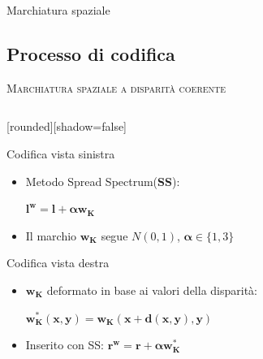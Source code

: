 \documentclass{beamer}
\begin{document}
\begin{section}{Marchiatura spaziale}
\subsection{Processo di codifica}
\begin{frame}[t]{\textsc{Marchiatura spaziale a disparit\`{a} coerente}}
\vspace{-2em}
\begin{columns}
\begin{column}{6cm}
	[rounded][shadow=false]
\vspace{1em}
\begin{block}{Codifica vista sinistra}
\begin{itemize}
\item Metodo Spread Spectrum(\textbf{SS}):
\begin{center}
$\boldsymbol{l^{w} = l+\alpha w_{K}}$
\end{center}
\item Il marchio $\mathbf{w_{K}}$ segue $N(0, 1)$, $\boldsymbol{\alpha} \in \{1,3\}$
\end{itemize}
\end{block}
\begin{block}{Codifica vista destra}
\begin{itemize}
\item $\mathbf{w_{K}}$ deformato in base ai valori della disparit\`{a}:
\begin{center}
 $\boldsymbol{w^{*}_{K}(x,y) = w_{K}(x+d(x,y), y)}$
\end{center}
\item Inserito con SS:
$ \boldsymbol{r^{w} = r+\alpha w^{*}_{K}}$
\end{itemize}
\end{block}
\end{column}
\begin{column}{5cm}
\vspace{2em}
\begin{center}
\begin{figure}

\end{figure}
\end{center}
\end{column}
\end{columns}
\end{frame}
\end{section}
\end{document}
